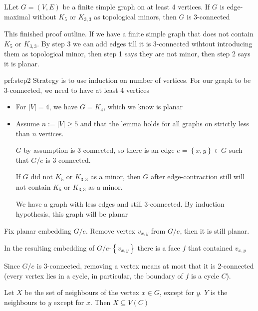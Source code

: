 \par\bigskip
\begin{lem}
  LLet $G = (V,E)$ be a finite simple graph on at least 4 vertices. If $G$ is edge-maximal without $K_5$ or $K_{3,3}$ as topological minors, then $G$ is 3-connected 
\end{lem}
\par\bigskip
\noindent This finished proof outline. If we have a finite simple graph that does not contain $K_5$ or $K_{3,3}$. By step 3 we can add edges till it is 3-connected wihtout introducing them as topological minor, then step 1 says they are not minor, then step 2 says it is planar.
\newpage
\begin{prf}[Step 2]{prf:step2}
  Strategy is to use induction on number of vertices. For our graph to be 3-connected, we need to have at least 4 vertices
  \par\bigskip
  \begin{itemize}
    \item For $\left|V\right| = 4$, we have $G = K_4$, which we know is planar\par
    \item Assume $n:=\left|V\right|\geq 5$ and that the lemma holds for all graphs on strictly less than $n$ vertices.
      \par\bigskip
    \noindent $G$ by assumption is 3-connected, so there is an edge $e = \left\{x,y\right\}\in G$ such that $G/e$ is 3-connected.
    \par\bigskip
    \noindent If $G$ did not $K_5$ or $K_{3,3}$ as a minor, then $G$ after edge-contraction still will not contain $K_5$ or $K_{3,3}$ as a minor.
    \par\bigskip
    \noindent We have a graph with less edges and still 3-connected. By induction hypothesis, this graph will be planar 
  \end{itemize}
  \par\bigskip
  \noindent Fix planar embedding $G/e$. Remove vertex $v_{x,y}$  from $G/e$, then it is still planar.\par
  \noindent In the resulting embedding of $G/e$-$\left\{v_{x,y}\right\}$ there is a face $f$ that contained $v_{x,y}$
  \par\bigskip
  \noindent Since $G/e$ is 3-connected, removing a vertex means at most that it is 2-connected (every vertex lies in a cycle, in particular, the boundary of $f$ is a cycle $C$).
  \par\bigskip
  \noindent Let $X$ be the set of neighbours of the vertex $x\in G$, except for $y$. $Y$ is the neighbours to $y$ except for $x$. Then $X\subseteq V(C)$

\end{prf}
